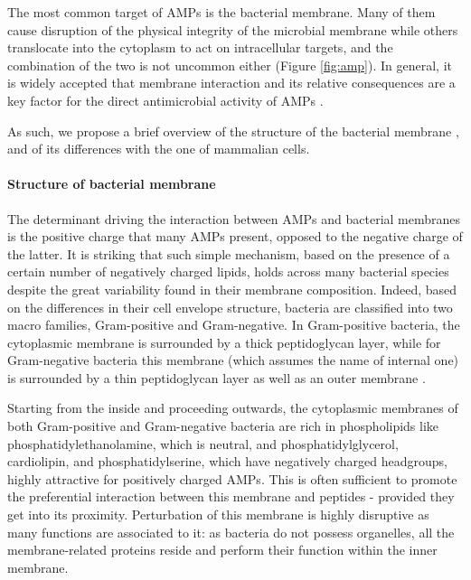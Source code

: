 The most common target of AMPs is the bacterial membrane. Many of them cause disruption of the physical integrity of the microbial membrane while others translocate into the cytoplasm to act on intracellular targets, and the combination of the two is not uncommon either \cite{Hancock2006} (Figure \ref{fig:amp}). In general, it is widely accepted that membrane interaction and its relative consequences are a key factor for the direct antimicrobial activity of AMPs \cite{Nguyen2011}.

As such, we propose a brief overview of the structure of the bacterial membrane \cite{Silhavy2010}, and of its differences with the one of mammalian cells.


\paragraph{Structure of bacterial membrane}
The determinant driving the interaction between AMPs and bacterial membranes is the positive charge that many AMPs present, opposed to the negative charge of the latter.
%
It is striking that such simple mechanism, based on the presence of a certain number of negatively charged lipids, holds across many bacterial species despite the great variability found in their membrane composition.
%
Indeed, based on the differences in their cell envelope structure, bacteria are classified into two macro families, Gram-positive and Gram-negative.
%
In Gram-positive bacteria, the cytoplasmic membrane is surrounded by a thick peptidoglycan layer, while for Gram-negative bacteria this membrane (which assumes the name of internal one) is surrounded by a thin peptidoglycan layer as well as an outer membrane \cite{Lin2016}.

Starting from the inside and proceeding outwards, the cytoplasmic membranes of both Gram-positive and Gram-negative bacteria are rich in phospholipids like phosphatidylethanolamine, which is neutral, and phosphatidylglycerol, cardiolipin, and phosphatidylserine, which have negatively charged headgroups, highly attractive for positively charged AMPs. This is often sufficient to promote the preferential interaction between this membrane and peptides - provided they get into its proximity.
%
Perturbation of this membrane is highly disruptive as many functions are associated to it: as bacteria do not possess organelles, all the membrane-related proteins reside and perform their function within the inner membrane. 

